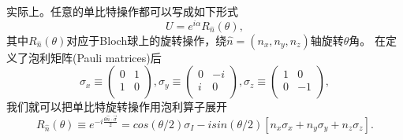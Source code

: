  实际上。任意的单比特操作都可以写成如下形式
 \begin{equation}
      U = e^{i\alpha}R_{\hat{n}}(\theta),
 \end{equation}
 其中$R_{\hat{n}}(\theta)$对应于Bloch球上的旋转操作，绕$\hat{n}=(n_x,n_y,n_z)$轴旋转$\theta$角。
 在定义了泡利矩阵(Pauli matrices)后
 \begin{equation}
      \sigma_x\equiv \left(
                       \begin{array}{cc}
                         0 & 1 \\
                         1 & 0 \\
                       \end{array}
                     \right),  \sigma_y\equiv \left(
                       \begin{array}{cc}
                         0 & -i \\
                         i & 0 \\
                       \end{array}
                     \right),  \sigma_z\equiv \left(
                       \begin{array}{cc}
                         1 & 0 \\
                         0 & -1 \\
                       \end{array}
                     \right),
\end{equation}
我们就可以把单比特旋转操作用泡利算子展开
\begin{equation}
    R_{\hat{n}}(\theta)\equiv e^{-i\frac{\theta\hat{n}\cdot\overrightarrow{\sigma}}{2}}  = cos(\theta/2)\sigma_I - isin(\theta/2)[n_x \sigma_x+n_y \sigma_y+n_z \sigma_z].
\end{equation}

